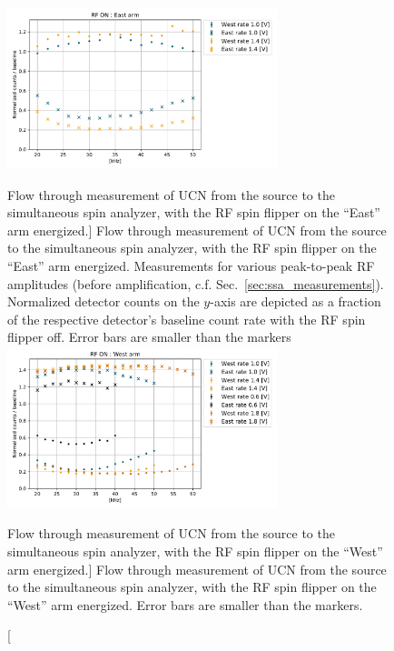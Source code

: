 \begin{figure}
    \centering
    \includegraphics[width=0.7\textwidth]{figures/RF_ON_East_arm.pdf}
    \caption
    [Flow through measurement of UCN from the source to the simultaneous spin analyzer, with the RF spin flipper on the ``East'' arm energized.]
    {Flow through measurement of UCN from the source to the simultaneous spin analyzer, with the RF spin flipper on the ``East'' arm energized. Measurements for various peak-to-peak RF amplitudes (before amplification, c.f. Sec.~\ref{sec:ssa_measurements}). Normalized detector counts on the $y$-axis are depicted as a fraction of the respective detector's baseline count rate with the RF spin flipper off. Error bars are smaller than the markers}
    \label{fig:Fall2020_SSA_RF_east}
    \vspace{\baselineskip}
    \centering
    \includegraphics[width=0.7\textwidth]{figures/RF_ON_West_arm.pdf}
    \caption
    [Flow through measurement of UCN from the source to the simultaneous spin analyzer, with the RF spin flipper on the ``West'' arm energized.]
    {Flow through measurement of UCN from the source to the simultaneous spin analyzer, with the RF spin flipper on the ``West'' arm energized. Error bars are smaller than the markers.}\label{fig:Fall2020_SSA_RF_west}
\end{figure}

